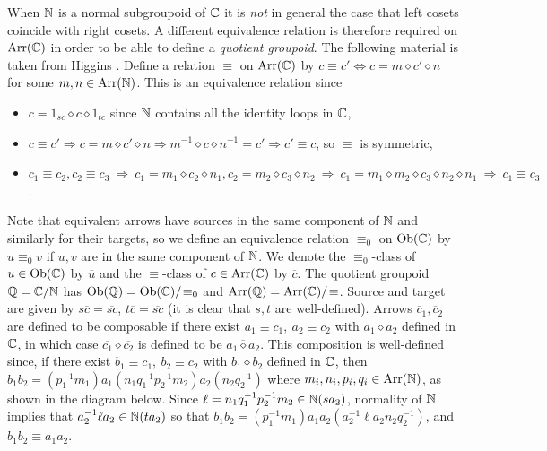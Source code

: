 \medskip
When $\mathbb{N}$ is a normal subgroupoid of $\mathbb{C}$ it is \emph{not} in general 
the case that left cosets coincide with right cosets. 
A different equivalence relation is therefore required on $\mathrm{Arr}(\mathbb{C})$ 
in order to be able to define a \emph{quotient groupoid}. 
The following material is taken from Higgins \cite{higgins-gpds}.
Define a relation $\equiv$ on $\mathrm{Arr}(\mathbb{C})$ by 
$c \equiv c' \Leftrightarrow c = m \diamond c' \diamond n$ 
for some $m,n \in \mathrm{Arr}(\mathbb{N})$. 
This is an equivalence relation since 
\begin{itemize}
\item
$c = 1_{sc}\diamond c \diamond 1_{tc}$ since $\mathbb{N}$ contains 
all the identity loops in $\mathbb{C}$,  
\item
$c \equiv c' \Rightarrow c = m \diamond c' \diamond n 
             \Rightarrow m^{-1} \diamond c \diamond n^{-1} = c' 
             \Rightarrow c' \equiv c$, so $\equiv$ is symmetric, 
\item
$c_1 \equiv c_2, c_2 \equiv c_3 
 ~\Rightarrow~ c_1 = m_1 \diamond c_2 \diamond n_1, 
               c_2 = m_2 \diamond c_3 \diamond n_2 
 ~\Rightarrow~ c_1 = m_1 \diamond m_2 \diamond c_3 \diamond n_2 \diamond n_1 
 ~\Rightarrow~ c_1 \equiv c_3$. 
\end{itemize} 
Note that equivalent arrows have sources in the same component of $\mathbb{N}$ 
and similarly for their targets, so we define an equivalence relation 
$\equiv_0$ on $\mathrm{Ob}(\mathbb{C})$ by $u \equiv_0 v$ if $u,v$ 
are in the same component of $\mathbb{N}$. 
We denote the $\equiv_0$-class of $u \in \mathrm{Ob}(\mathbb{C})$ by $\overline{u}$ 
and the $\equiv$-class of $c \in \mathrm{Arr}(\mathbb{C})$ by $\overline{c}$. 
The quotient groupoid $\mathbb{Q} = \mathbb{C}/\mathbb{N}$ 
has $\mathrm{Ob}(\mathbb{Q}) = \mathrm{Ob}(\mathbb{C})/\!\equiv_0$ and $\mathrm{Arr}(\mathbb{Q}) = \mathrm{Arr}(\mathbb{C})/\!\equiv$. 
Source and target are given by $s\overline{c} = \overline{sc}$, 
$t\overline{c} = \overline{sc}$ (it is clear that $s,t$ are well-defined). 
Arrows $\overline{c}_1, \overline{c}_2$ are defined to be composable 
if there exist $a_1 \equiv c_1,~ a_2 \equiv c_2$ 
with $a_1 \diamond a_2$ defined in $\mathbb{C}$, 
in which case $\overline{c_1}\diamond\overline{c_2}$ 
is defined to be $\overline{a_1 \diamond a_2}$. 
This composition is well-defined since, 
if there exist $b_1 \equiv c_1,~ b_2 \equiv c_2$ 
with $b_1 \diamond b_2$ defined in $\mathbb{C}$, then 
$b_1b_2 = (p_1^{-1}m_1)a_1(n_1q_1^{-1}p_2^{-1}m_2)a_2(n_2q_2^{-1})$ 
where $m_i,n_i,p_i,q_i \in \mathrm{Arr}(\mathbb{N})$, as shown in the diagram below.  
Since $\ell=n_1q_1^{-1}p_2^{-1}m_2 \in \mathbb{N}(sa_2)$, 
normality of $\mathbb{N}$ implies that $a_2^{-1} \ell a_2 \in \mathbb{N}(ta_2)$ 
so that $b_1b_2 = (p_1^{-1}m_1)a_1a_2(a_2^{-1} \ell a_2n_2q_2^{-1})$, 
and $b_1b_2 \equiv a_1a_2$.  

